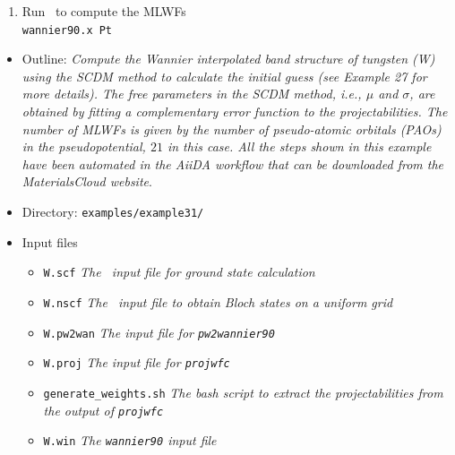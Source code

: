 \documentclass[a4paper,11pt,twoside]{article}
\begin{document}
\begin{enumerate}
    \item Run \wannier\ to compute the MLWFs\\
    {\tt wannier90.x Pt}\\

\end{enumerate}


\begin{itemize}
        \item{Outline: {\it Compute the Wannier interpolated band structure of tungsten (W)
                            using the SCDM method to calculate the initial guess (see Example 27 for more details). The free parameters
                            in the SCDM method, i.e., $\mu$ and $\sigma$, are obtained by fitting 
                            a complementary error
                            function to the projectabilities. The number of MLWFs is given by the number
                            of pseudo-atomic orbitals (PAOs) in the pseudopotential, $21$ in this case. All the steps shown in this example have been automated in the AiiDA\cite{Pizzi_AiiDA} workflow that can be downloaded from the MaterialsCloud website\cite{MaterialsCloudArchiveEntry}}.}
        \item{Directory: {\tt examples/example31/}}
        \item{Input files}
        \begin{itemize}
                \item{ {\tt W.scf} {\it The \pwscf\ input file for ground state
                                calculation}}
                \item{ {\tt W.nscf}  {\it The \pwscf\ input file to obtain Bloch
                                states on a uniform grid}}
                \item{ {\tt W.pw2wan}  {\it The input file for {\tt pw2wannier90}}}
                \item{ {\tt W.proj}  {\it The input file for {\tt projwfc}}}
                \item{ {\tt generate\_weights.sh} {\it The bash script to extract the projectabilities from the output of {\tt projwfc} }}
                \item{ {\tt W.win}  {\it The {\tt wannier90} input file}}
        \end{itemize}
\end{itemize}
\end{document}
